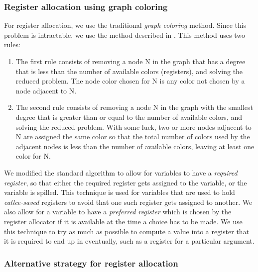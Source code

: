 \subsubsection{Register allocation using graph coloring}

For register allocation, we use the traditional \emph{graph coloring}
method.  Since this problem is intractable, we use the method
described in \cite{Muchnick:1998:ACD:286076}.  This method uses two
rules:

\begin{enumerate}
\item The first rule consists of removing a node N in the graph that
  has a degree that is less than the number of available colors
  (registers), and solving the reduced problem.  The node color chosen
  for N is any color not chosen by a node adjacent to N.
\item The second rule consists of removing a node N in the graph with
  the smallest degree that is greater than or equal to the number of
  available colors, and solving the reduced problem.  With some luck,
  two or more nodes adjacent to N are assigned the same color so that
  the total number of colors used by the adjacent nodes is less than
  the number of available colors, leaving at least one color for N.
\end{enumerate}

We modified the standard algorithm to allow for variables to have a
\emph{required register}, so that either the required register gets
assigned to the variable, or the variable is spilled.  This technique
is used for variables that are used to hold \emph{callee-saved}
registers to avoid that one such register gets assigned to another.
We also allow for a variable to have a \emph{preferred register} which
is chosen by the register allocator if it is available at the time a
choice has to be made.  We use this technique to try as much as
possible to compute a value into a register that it is required to end
up in eventually, such as a register for a particular argument.%

\subsubsection{Alternative strategy for register allocation}

